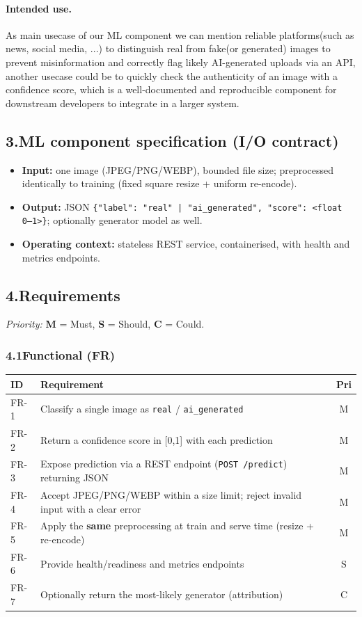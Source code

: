 \documentclass[11pt]{article}
\begin{document}
\paragraph{Intended use.} As main usecase of our ML component we can mention reliable platforms(such as news, social media, ...) to distinguish real from fake(or generated) images to prevent misinformation and correctly flag likely AI-generated uploads via an API, another usecase could be to quickly check the authenticity of an image with a confidence score, which is a well-documented and reproducible component for downstream developers to integrate in a larger system.


\subsection*{3.\quad ML component specification (I/O contract)}
\begin{itemize}[nosep,leftmargin=1.4em]
  \item \textbf{Input:} one image (JPEG/PNG/WEBP), bounded file size; preprocessed identically to training (fixed square resize + uniform re-encode).
  \item \textbf{Output:} JSON \texttt{\{"label": "real" | "ai\_generated", "score": <float 0--1>\}}; optionally generator model as well.
  \item \textbf{Operating context:} stateless REST service, containerised, with health and metrics endpoints.
\end{itemize}

\newpage

\subsection*{4.\quad Requirements}
\noindent\textit{Priority:} \textbf{M} = Must, \textbf{S} = Should, \textbf{C} = Could.

\subsubsection*{4.1\quad Functional (FR)}
\begin{tabularx}{\textwidth}{@{}l Y c@{}}
\toprule
\textbf{ID} & \textbf{Requirement} & \textbf{Pri} \\
\midrule
FR-1 & Classify a single image as \texttt{real} / \texttt{ai\_generated} & M \\
FR-2 & Return a confidence score in [0,1] with each prediction & M \\
FR-3 & Expose prediction via a REST endpoint (\texttt{POST /predict}) returning JSON & M \\
FR-4 & Accept JPEG/PNG/WEBP within a size limit; reject invalid input with a clear error & M \\
FR-5 & Apply the \textbf{same} preprocessing at train and serve time (resize + re-encode) & M \\
FR-6 & Provide health/readiness and metrics endpoints & S \\
FR-7 & Optionally return the most-likely generator (attribution) & C \\
\bottomrule
\end{tabularx}
\end{document}
